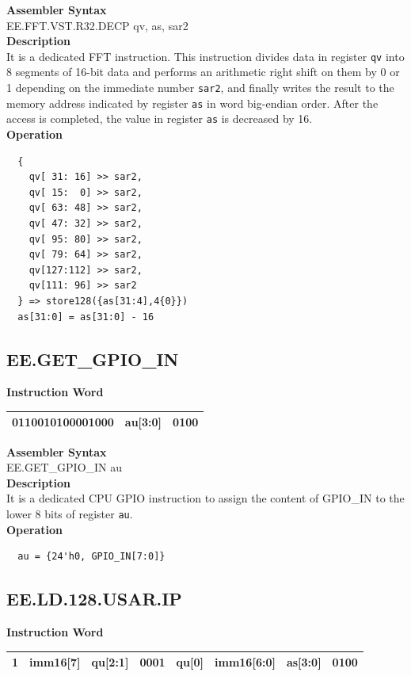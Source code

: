\textbf{Assembler Syntax} \\
EE.FFT.VST.R32.DECP qv, as, sar2 \\
\textbf{Description} \\
It is a dedicated FFT instruction. This instruction divides data in register \lstinline {qv} into 8 segments of 16-bit data and performs an arithmetic right shift on them by 0 or 1 depending on the immediate number \lstinline{sar2}, and finally writes the result to the memory address indicated by register \lstinline{as} in word big-endian order. After the access is completed, the value in register \lstinline{as} is decreased by 16.\\
\textbf{Operation}
\begin{lstlisting}
  {
    qv[ 31: 16] >> sar2,
    qv[ 15:  0] >> sar2,
    qv[ 63: 48] >> sar2,
    qv[ 47: 32] >> sar2,
    qv[ 95: 80] >> sar2,
    qv[ 79: 64] >> sar2,
    qv[127:112] >> sar2,
    qv[111: 96] >> sar2
  } => store128({as[31:4],4{0}})
  as[31:0] = as[31:0] - 16
\end{lstlisting}

\clearpage
\subsection{EE.GET\_GPIO\_IN}\label{instruction:EEGETGPIOIN}
\setlength\tabcolsep{6pt}
\textbf{Instruction Word} \\
\begin{tabular}{|c|c|c|}
	\hline
	0110010100001000 & au[3:0] & 0100 \\
	\hline
\end{tabular}

\textbf{Assembler Syntax} \\
EE.GET\_GPIO\_IN au \\
\textbf{Description} \\
It is a dedicated CPU GPIO instruction to assign the content of GPIO\_IN to the lower 8 bits of register \lstinline{au}.\\
\textbf{Operation}
\begin{lstlisting}
  au = {24'h0, GPIO_IN[7:0]}
\end{lstlisting}

\clearpage
\subsection{EE.LD.128.USAR.IP}\label{instruction:EELD128USARIP}
\setlength\tabcolsep{6pt}
\textbf{Instruction Word} \\
\begin{tabular}{|c|c|c|c|c|c|c|c|}
	\hline
	1 & imm16[7] & qu[2:1] & 0001 & qu[0] & imm16[6:0] & as[3:0] & 0100 \\
	\hline
\end{tabular}

